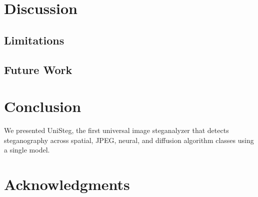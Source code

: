 \documentclass[conference]{IEEEtran}
\newcommand{\method}{UniSteg}
\begin{document}
\section{Discussion}
\label{sec:discussion}

\subsection{Limitations}

\subsection{Future Work}

\section{Conclusion}
\label{sec:conclusion}

We presented \method{}, the first universal image steganalyzer that detects steganography across spatial, JPEG, neural, and diffusion algorithm classes using a single model.

\section*{Acknowledgments}



\end{document}
